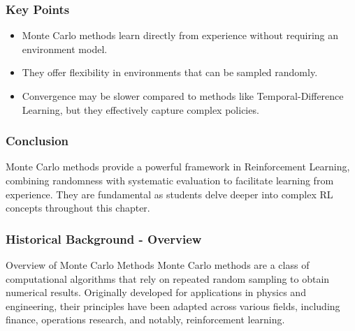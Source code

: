 \documentclass[aspectratio=169]{beamer}
\begin{document}
\begin{frame}[fragile]
    \frametitle{Key Points}
    \begin{itemize}
        \item Monte Carlo methods learn directly from experience without requiring an environment model.
        \item They offer flexibility in environments that can be sampled randomly.
        \item Convergence may be slower compared to methods like Temporal-Difference Learning, but they effectively capture complex policies.
    \end{itemize}
\end{frame}

\begin{frame}[fragile]
    \frametitle{Conclusion}
    Monte Carlo methods provide a powerful framework in Reinforcement Learning, combining randomness with systematic evaluation to facilitate learning from experience. They are fundamental as students delve deeper into complex RL concepts throughout this chapter.
\end{frame}

\begin{frame}[fragile]
    \frametitle{Historical Background - Overview}
    \begin{block}{Overview of Monte Carlo Methods}
        Monte Carlo methods are a class of computational algorithms that rely on repeated random sampling to obtain numerical results. Originally developed for applications in physics and engineering, their principles have been adapted across various fields, including finance, operations research, and notably, reinforcement learning.
    \end{block}
\end{frame}
\end{document}
